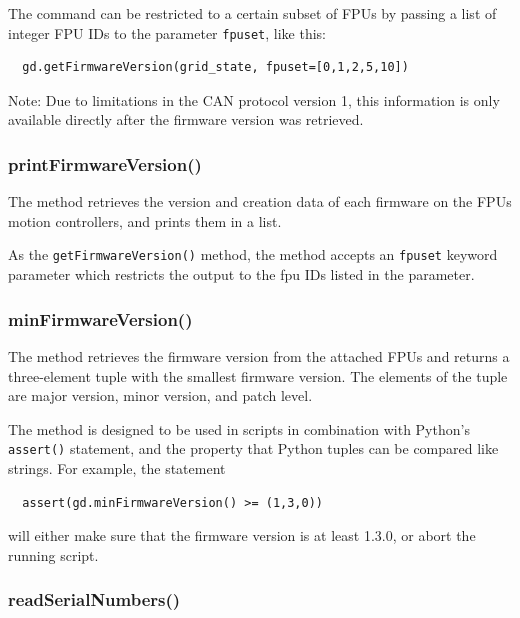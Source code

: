 \documentclass[11pt,a4paper]{report}
\begin{document}
The command can be restricted to a certain subset of FPUs
by passing a list of integer FPU IDs to the parameter
\texttt{fpuset}, like this:
  
\begin{verbatim}
  gd.getFirmwareVersion(grid_state, fpuset=[0,1,2,5,10])
\end{verbatim}

Note: Due to limitations in the CAN protocol version 1, this
information is only available directly after the firmware version was
retrieved.


\subsubsection{printFirmwareVersion()}
\label{sec:printfirmwareversion}

The method retrieves the version and creation data of each firmware on
the FPUs motion controllers, and prints them in a list.

As the \texttt{getFirmwareVersion()} method, the method accepts an
\texttt{fpuset} keyword parameter which restricts the output to the fpu IDs
listed in the parameter.

\subsubsection{minFirmwareVersion()}
\label{sec:minfirmwareversion}
The method retrieves the firmware version from the attached FPUs and
returns a three-element tuple with the smallest firmware version.  The
elements of the tuple are major version, minor version, and patch
level.

The method is designed to be used in scripts in combination with
Python's \texttt{assert()} statement, and the property that Python
tuples can be compared like strings. For example, the statement
\begin{verbatim}
  assert(gd.minFirmwareVersion() >= (1,3,0))
\end{verbatim}
will either make sure that the firmware version is at least 1.3.0, or
abort the running script.

\subsubsection{readSerialNumbers()}
\end{document}
